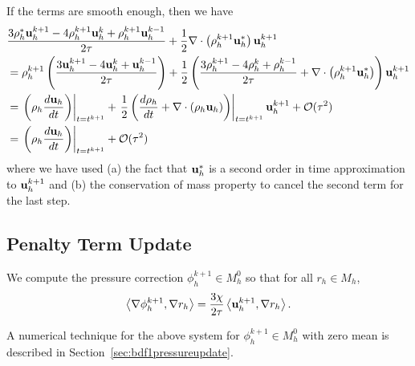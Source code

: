 \documentclass[letterpaper]{erdc}
\begin{document}
\begin{remark}
If the terms are smooth enough, then we have
\begin{align}
  &\frac{3\rho_h^{*}\textbf{u}_h^{k+1}-4\rho_h^{k+1}\textbf{u}_h^{k} +\rho_h^{k+1}\textbf{u}_h^{k-1}}{2\tau} +\frac{1}{2}\nabla\cdot\left(\rho_h^{k+1}\textbf{u}_h^{*}\right)\textbf{u}_h^{k+1}\\
   &= \rho_h^{k+1}\left(\frac{3\textbf{u}_h^{k+1} - 4\textbf{u}_h^{k} + \textbf{u}_h^{k-1}}{2\tau}\right) + \frac{1}{2} \left( \frac{3\rho_h^{k+1} -4\rho_h^{k} + \rho_h^{k-1}}{2\tau} + \nabla\cdot\left(\rho_h^{k+1}\textbf{u}_h^{*}\right)\right)\textbf{u}_h^{k+1}\\
  &= \left.\left(\rho_h\frac{d\textbf{u}_h}{dt} \right)\right|_{t=t^{k+1}} + \left.\frac{1}{2} \left( \frac{d\rho_h}{dt} +\nabla\cdot\left(\rho_h\textbf{u}_h\right)\right)\right|_{t=t^{k+1}}\textbf{u}_h^{k+1} + \mathcal{O}(\tau^2)\\
  &=\left.\left(\rho_h\frac{d\textbf{u}_h}{dt} \right)\right|_{t=t^{k+1}} + \mathcal{O}(\tau^{2})
\end{align}
where we have used (a) the fact that $\textbf{u}_h^{*}$ is a second order in time approximation to $\textbf{u}_h^{k+1}$ and (b) the conservation of mass property to cancel the second term for the last step.
\end{remark}




%
%
\subsection{Penalty Term Update}
We compute the pressure correction $\phi_h^{k+1}\in M^0_h$ so that for all $r_h\in M_h$,
\begin{equation}
  \left\langle \nabla\phi_h^{k+1}, \nabla r_h \right\rangle = \frac{3\chi}{2\tau}\left\langle \textbf{u}_h^{k+1}, \nabla r_h \right\rangle.
\end{equation}

\begin{remark}
  A numerical technique for the above system for $\phi_h^{k+1}\in M_h^0$ with zero mean is described in Section~\ref{sec:bdf1pressureupdate}.
\end{remark}

%
%
\end{document}
